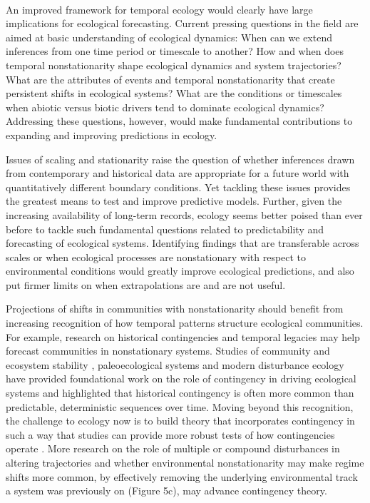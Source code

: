 \documentclass[11pt,a4paper,oneside]{article}
\begin{document}
\\

\noindent An improved framework for temporal ecology would clearly have large implications for ecological forecasting. Current pressing questions in the field are aimed at basic understanding of ecological dynamics: When can we extend inferences from one time period or timescale to another? How and when does temporal nonstationarity shape ecological dynamics and system trajectories? What are the attributes of events and temporal nonstationarity that create persistent shifts in ecological systems? What are the conditions or timescales when abiotic versus biotic drivers tend to dominate ecological dynamics?  Addressing these questions, however, would make fundamental contributions to expanding and improving predictions in ecology. 

Issues of scaling and stationarity raise the question of whether inferences drawn from contemporary and historical data are appropriate for a future world with quantitatively different boundary conditions. Yet tackling these issues provides the greatest means to test and improve predictive models. Further, given the increasing availability of long-term records, ecology seems better poised than ever before to tackle such fundamental questions related to predictability and forecasting of ecological systems. Identifying findings that are transferable across scales or when ecological processes are nonstationary with respect to environmental conditions would greatly improve ecological predictions, and also put firmer limits on when extrapolations are and are not useful. 

Projections of shifts in communities with nonstationarity should benefit from increasing recognition of how temporal patterns structure ecological communities. For example, research on historical contingencies and temporal legacies may help forecast communities in nonstationary systems. Studies of community and ecosystem stability \citep{Boettiger2013}, paleoecological systems and modern disturbance ecology have provided foundational work on the role of contingency in driving ecological systems and highlighted that historical contingency is often more common than predictable, deterministic sequences over time. Moving beyond this recognition, the challenge to ecology now is to build theory that incorporates contingency in such a way that studies can provide more robust tests of how contingencies operate \citep{vannette2014}. More research on the role of multiple or compound disturbances in altering trajectories and whether environmental nonstationarity may make regime shifts more common, by effectively removing the underlying environmental track a system was previously on (Figure 5c), may advance contingency theory. %
\end{document}

